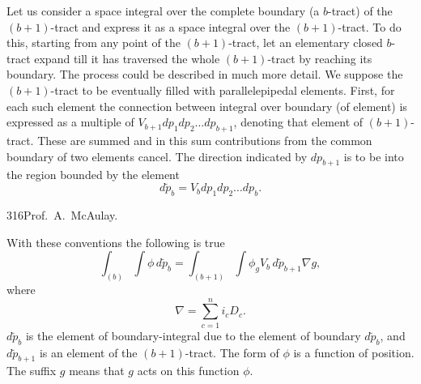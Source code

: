 \documentclass[11pt]{article}
\begin{document}
\indent Let us consider a space integral over the complete boundary (a $b$-tract) of the $(b+1)$-tract and express it as a space integral over the $(b+1)$-tract. To do this, starting from any point of the $(b+1)$-tract, let an elementary closed $b$-tract expand till it has traversed the whole $(b+1)$-tract by reaching its boundary. The process could be described in much more detail. We suppose the $(b+1)$-tract to be eventually filled with parallelepipedal elements. First, for each such element the connection between integral over boundary (of element) is expressed as a multiple of $V_{b+1}dp_1dp_2\ldots dp_{b+1}$, denoting that element of $(b+1)$-tract. These are summed and in this sum contributions from the common boundary of two elements cancel. The direction indicated by $dp_{b+1}$ is to be into the region bounded by the element
\[d\breve p_b=V_bdp_1dp_2\ldots dp_b.\]

\newpage\thispagestyle{empty}\begin{center}316\hfill Prof.\ A.\ McAulay.\end{center}
\begingroup\normalsize

With these conventions the following is true
\begin{equation}\int_{(b)}\!\int \phi\,d\breve p_b=\int_{(b+1)}\!\int \phi_gV_b\,d\breve p_{b+1}\nabla g,\tag{1}\end{equation}
where
\begin{equation}\nabla=\sum_{c=1}^ni_cD_c.\tag{2}\end{equation}
$d\breve p_b$ is the element of boundary-integral due to the element of boundary $d\breve p_b$, and $d\breve p_{b+1}$ is an element of the $(b+1)$-tract. The form of $\phi$ is a function of position. The suffix $g$ means that $g$ acts on this function $\phi$.
\end{document}
